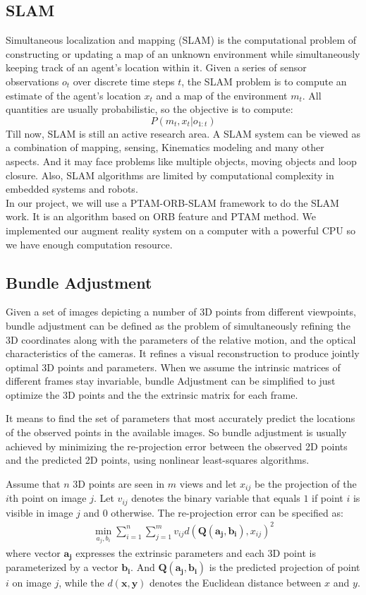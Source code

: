 \documentclass[paper=a4, fontsize=14pt]{scrartcl}
\numberwithin{equation}{section}		%
\numberwithin{figure}{section}			%
\numberwithin{table}{section}				%
\begin{document}
\subsection{SLAM}
Simultaneous localization and mapping (SLAM) is the computational problem of constructing or updating a map of an unknown environment while simultaneously keeping track of an agent's location within it.
Given a series of sensor observations $o_{t}$ over discrete time steps $t$, the SLAM problem is to compute an estimate of the agent's location $x_{t}$ and a map of the environment $m_{t}$. All quantities are usually probabilistic, so the objective is to compute:
$$P(m_{t},x_{t}|o_{1:t})$$
\indent Till now, SLAM is still an active research area.
A SLAM system can be viewed as a combination of mapping, sensing, Kinematics modeling and many other aspects. 
And it may face problems like multiple objects, moving objects and loop closure. 
Also, SLAM algorithms are limited by computational complexity in embedded systems and robots.\\
\indent In our project, we will use a PTAM-ORB-SLAM framework to do the SLAM work. It is an algorithm based on ORB feature and PTAM method. We implemented our augment reality system on a computer with a powerful CPU so we have enough computation resource.

\subsection{Bundle Adjustment}
Given a set of images depicting a number of 3D points from different viewpoints, bundle adjustment can be defined as the problem of simultaneously refining the 3D coordinates along with the parameters of the relative motion, and the optical characteristics of the cameras.
It refines a visual reconstruction to produce jointly optimal 3D points and parameters.
When we assume the intrinsic matrices of different frames stay invariable, bundle Adjustment can be simplified to just optimize the 3D points and the the extrinsic matrix for each frame. 

It means to find the set of parameters that most accurately predict the locations of the observed points in the available images. 
So bundle adjustment is usually achieved by minimizing the re-projection error between the observed 2D points and the predicted 2D points, using nonlinear least-squares algorithms.

Assume that $n$ 3D points are seen in $m$ views and let $x_{ij}$ be the projection of the $i$th point on image $j$.
Let $v_{ij}$ denotes the binary variable that equals $1$ if point $i$ is visible in image $j$ and $0$ otherwise.
The re-projection error can be specified as:
\begin{align*}
    \min_{a_j, b_i}\sum_{i=1}^n\sum_{j=1}^m v_{ij} d(\mathbf{Q}(\mathbf{a_j}, \mathbf{b_i}), x_{ij})^2
\end{align*}
where vector $\mathbf{a_j}$ expresses the extrinsic parameters and each 3D point is parameterized by a vector $\mathbf{b_i}$.
And $\mathbf{Q}(\mathbf{a_j}, \mathbf{b_i})$ is the predicted projection of point $i$ on image $j$, while the $d(\mathbf{x}, \mathbf{y})$ denotes the Euclidean distance between $x$ and $y$.
\end{document}
